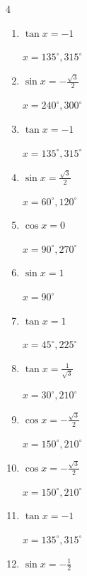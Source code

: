 \begin{multicols}{4}
\begin{enumerate}
        $\displaystyle x = 210^{\circ} , 330^{\circ}$

  \item $\displaystyle \tan{x}  = -1$

        $\displaystyle x = 135^{\circ} , 315^{\circ}$

  \item $\displaystyle \sin{x}  = -\frac{\sqrt{3}}{2}$

        $\displaystyle x = 240^{\circ} , 300^{\circ}$

  \item $\displaystyle \tan{x}  = -1$

        $\displaystyle x = 135^{\circ} , 315^{\circ}$

  \item $\displaystyle \sin{x}  = \frac{\sqrt{3}}{2}$

        $\displaystyle x = 60^{\circ} , 120^{\circ}$

  \item $\displaystyle \cos{x}  = 0$

        $\displaystyle x = 90^{\circ} , 270^{\circ}$

  \item $\displaystyle \sin{x}  = 1$

        $\displaystyle x = 90^{\circ}$

\columnbreak %

  \item $\displaystyle \tan{x}  = 1$

        $\displaystyle x = 45^{\circ} , 225^{\circ}$

  \item $\displaystyle \tan{x}  = \frac{1}{\sqrt{3}}$

        $\displaystyle x = 30^{\circ} , 210^{\circ}$

  \item $\displaystyle \cos{x}  = -\frac{\sqrt{3}}{2}$

        $\displaystyle x = 150^{\circ} , 210^{\circ}$

  \item $\displaystyle \cos{x}  = -\frac{\sqrt{3}}{2}$

        $\displaystyle x = 150^{\circ} , 210^{\circ}$

  \item $\displaystyle \tan{x}  = -1$

        $\displaystyle x = 135^{\circ} , 315^{\circ}$

  \item $\displaystyle \sin{x}  = -\frac{1}{2}$


\end{enumerate}
\end{multicols}
